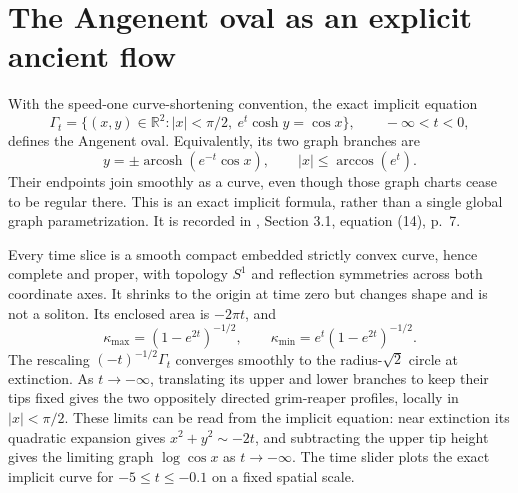 \chapter{The Angenent oval as an explicit ancient flow}\label{sec:catalogue-angenent-oval}
\begin{example}\label{ex:catalogue-angenent-oval}
With the speed-one curve-shortening convention, the exact implicit equation
\[
 \Gamma_t=\{(x,y)\in\mathbb R^2:|x|<\pi/2,\ e^t\cosh y=\cos x\},
 \qquad -\infty<t<0,
\]
defines the Angenent oval. Equivalently, its two graph branches are
\[
 y=\pm\operatorname{arcosh}(e^{-t}\cos x),
 \qquad |x|\leq\arccos(e^t).
\]
Their endpoints join smoothly as a curve, even though those graph charts cease to be regular there. This is an exact implicit formula, rather than a single global graph parametrization. It is recorded in \cite{BV11}, Section 3.1, equation (14), p.~7.

Every time slice is a smooth compact embedded strictly convex curve, hence complete and proper, with topology $S^1$ and reflection symmetries across both coordinate axes. It shrinks to the origin at time zero but changes shape and is not a soliton. Its enclosed area is $-2\pi t$, and
\[
 \kappa_{\max}=(1-e^{2t})^{-1/2},\qquad
 \kappa_{\min}=e^t(1-e^{2t})^{-1/2}.
\]
The rescaling $(-t)^{-1/2}\Gamma_t$ converges smoothly to the radius-$\sqrt2$ circle at extinction. As $t\to-\infty$, translating its upper and lower branches to keep their tips fixed gives the two oppositely directed grim-reaper profiles, locally in $|x|<\pi/2$. These limits can be read from the implicit equation: near extinction its quadratic expansion gives $x^2+y^2\sim-2t$, and subtracting the upper tip height gives the limiting graph $\log\cos x$ as $t\to-\infty$. The time slider plots the exact implicit curve for $-5\leq t\leq-0.1$ on a fixed spatial scale.
\end{example}

